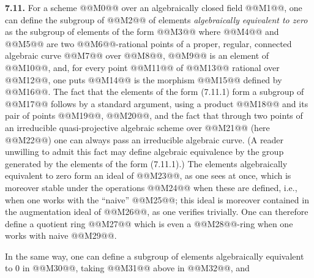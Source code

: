
\textbf{7.11.} For a scheme @@M0@@ over an algebraically closed field @@M1@@, one can define the subgroup of @@M2@@ of elements \emph{algebraically equivalent to zero} as the subgroup of elements of the form
@@M3@@
where @@M4@@ and @@M5@@ are two @@M6@@-rational points of a proper, regular, connected algebraic curve @@M7@@ over @@M8@@, @@M9@@ is an element of @@M10@@, and, for every point @@M11@@ of @@M13@@ rational over @@M12@@, one puts
@@M14@@
is the morphism @@M15@@ defined by @@M16@@. The fact that the elements of the form (7.11.1) form a subgroup of @@M17@@ follows by a standard argument, using a product @@M18@@ and its pair of points @@M19@@, @@M20@@, and the fact that through two points of an irreducible quasi-projective algebraic scheme over @@M21@@ (here @@M22@@) one can always pass an irreducible algebraic curve. (A reader unwilling to admit this fact may define algebraic equivalence by the group generated by the elements of the form (7.11.1).) The elements algebraically equivalent to zero form an ideal of @@M23@@, as one sees at once, which is moreover stable under the operations @@M24@@ when these are defined, i.e., when one works with the ``naive'' @@M25@@; this ideal is moreover contained in the augmentation ideal of @@M26@@, as one verifies trivially. One can therefore define a quotient ring
@@M27@@
which is even a @@M28@@-ring when one works with naive @@M29@@.

In the same way, one can define a subgroup of elements algebraically equivalent to 0 in @@M30@@, taking @@M31@@ above in @@M32@@, and
